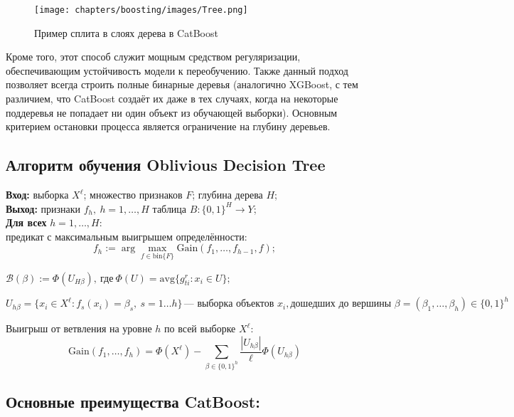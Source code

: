 \begin{figure}[ht]
    \centering
    \texttt{[image: chapters/boosting/images/Tree.png]}
    \caption{Пример сплита в слоях дерева в CatBoost}
\end{figure}

Кроме того, этот способ служит мощным средством регуляризации, обеспечивающим устойчивость модели к переобучению. Также данный подход позволяет всегда строить полные бинарные деревья (аналогично XGBoost, с тем различием, что CatBoost создаёт их даже в тех случаях, когда на некоторые поддеревья не попадает ни один объект из обучающей выборки). Основным критерием остановки процесса является ограничение на глубину деревьев.

\subsection*{Алгоритм обучения Oblivious Decision Tree}

\begin{tcolorbox}[colback=black!10, colframe=black]
\textbf{Вход:} выборка $X^\ell$; множество признаков $F$; глубина дерева $H$;\\
\textbf{Выход:} признаки $f_h, \ h = 1, \ldots, H$  таблица $B: \{0,1\}^H \to Y$;\\
\textbf{Для всех} $h = 1, \ldots, H$:\\
предикат с максимальным выигрышем определённости:
$$
f_h := \arg\max_{f \in \mathrm{bin}\{F\}} \text{Gain}(f_1, \ldots, f_{h-1}, f);
$$

\(\mathcal{B}(\beta) := \Phi(U_{H\beta}), \ \text{где} \ \Phi(U) = \text{avg}\{g_{ti}^r : x_i \in U\};\)
\end{tcolorbox}

$$
U_{h\beta} = \{x_i \in X^\ell : f_s(x_i) = \beta_s, \ s = 1 \ldots h\} \, \text{— выборка объектов } x_i,
\text{дошедших до вершины } \beta = (\beta_1, \ldots, \beta_h) \in \{0,1\}^h
$$

Выигрыш от ветвления на уровне \(h\) по всей выборке \(X^\ell\):
$$
\text{Gain}(f_1, \ldots, f_h) = \Phi(X^\ell) - \sum_{\beta \in \{0,1\}^h} \frac{|U_{h\beta}|}{\ell} \Phi(U_{h\beta})
$$

\subsection*{Основные преимущества CatBoost:}

